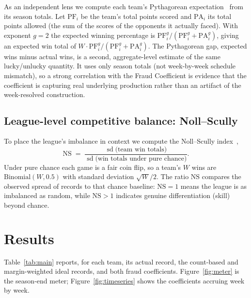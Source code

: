 \documentclass[11pt]{article}
\newcommand{\std}{\operatorname{sd}}
\begin{document}
As an independent lens we compute each team's Pythagorean
expectation~\cite{james1980s,carroll1988} from its season totals. Let
$\mathrm{PF}_i$ be the team's total points scored and $\mathrm{PA}_i$ its
total points allowed (the sum of the scores of the opponents it actually
faced). With exponent $g=2$ the expected winning percentage is
$\mathrm{PF}_i^{g}/(\mathrm{PF}_i^{g}+\mathrm{PA}_i^{g})$, giving an expected
win total of $W\cdot \mathrm{PF}_i^{g}/(\mathrm{PF}_i^{g}+\mathrm{PA}_i^{g})$.
The Pythagorean gap, expected wins minus actual wins, is a second,
aggregate-level estimate of the same lucky/unlucky quantity. It uses only
season totals (not week-by-week schedule mismatch), so a strong correlation
with the Fraud Coefficient is evidence that the coefficient is capturing real
underlying production rather than an artifact of the week-resolved
construction.

\subsection{League-level competitive balance: Noll--Scully}
\label{sec:nollscully}

To place the league's imbalance in context we compute the Noll--Scully
index~\cite{lopez2018,noll1988,scully1989},
\begin{equation}
\mathrm{NS} \;=\;
\frac{\std\bigl(\text{team win totals}\bigr)}
     {\std\bigl(\text{win totals under pure chance}\bigr)}.
\end{equation}
Under pure chance each game is a fair coin flip, so a team's $W$ wins are
$\mathrm{Binomial}(W,0.5)$ with standard deviation $\sqrt{W}/2$. The ratio
$\mathrm{NS}$ compares the observed spread of records to that chance
baseline: $\mathrm{NS}=1$ means the league is as imbalanced as random, while
$\mathrm{NS}>1$ indicates genuine differentiation (skill) beyond chance.

\section{Results}
\label{sec:results}

Table~\ref{tab:main} reports, for each team, its actual record, the
count-based and margin-weighted ideal records, and both fraud coefficients.
Figure~\ref{fig:meter} is the season-end meter; Figure~\ref{fig:timeseries}
shows the coefficients accruing week by week.
\end{document}
